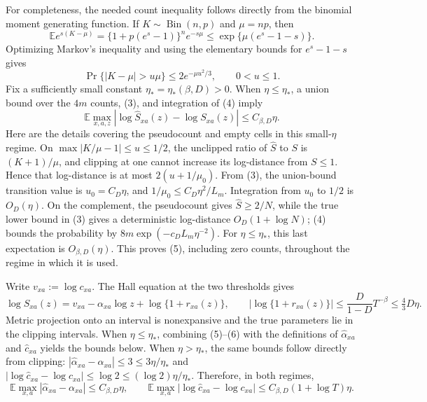 For completeness, the needed count inequality follows directly from the binomial moment generating function.  If \(K\sim\operatorname{Bin}(n,p)\) and \(\mu=np\), then
\[
\mathbb E e^{s(K-\mu)}
=\{1+p(e^s-1)\}^n e^{-s\mu}
\leq\exp\{\mu(e^s-1-s)\}.
\]
Optimizing Markov's inequality and using the elementary bounds for \(e^s-1-s\) gives
\[
\Pr\{|K-\mu|>u\mu\}\leq2e^{-\mu u^2/3},\qquad 0<u\leq1.               \tag{4}
\]
Fix a sufficiently small constant \(\eta_*=\eta_*(\beta,D)>0\).  When \(\eta\leq\eta_*\), a union bound over the \(4m\) counts, (3), and integration of (4) imply
\[
\mathbb E\max_{x,a,z}
\left|\log\widehat S_{xa}(z)-\log S_{xa}(z)\right|
\leq C_{\beta,D}\eta.                                                    \tag{5}
\]
Here are the details covering the pseudocount and empty cells in this small-\(\eta\) regime.  On
\(\max|K/\mu-1|\leq u\leq1/2\), the unclipped ratio of \(\widehat S\) to \(S\) is \((K+1)/\mu\), and clipping at one cannot increase its log-distance from \(S\leq1\).  Hence that log-distance is at most \(2(u+1/\mu_0)\).  From (3), the union-bound transition value is \(u_0=C_D\eta\), and \(1/\mu_0\leq C_D\eta^2/L_m\).  Integration from \(u_0\) to \(1/2\) is \(O_D(\eta)\).  On the complement, the pseudocount gives \(\widehat S\geq2/N\), while the true lower bound in (3) gives a deterministic log-distance \(O_D(1+\log N)\); (4) bounds the probability by \(8m\exp(-c_D L_m\eta^{-2})\).  For \(\eta\leq\eta_*\), this last expectation is \(O_{\beta,D}(\eta)\).  This proves (5), including zero counts, throughout the regime in which it is used.

Write \(v_{xa}:=\log c_{xa}\).  The Hall equation at the two thresholds gives
\[
\log S_{xa}(z)=v_{xa}-\alpha_{xa}\log z+\log\{1+r_{xa}(z)\},
\qquad
|\log\{1+r_{xa}(z)\}|\leq\frac{D}{1-D}T^{-\beta}\leq\tfrac43D\eta.     \tag{6}
\]
Metric projection onto an interval is nonexpansive and the true parameters lie in the clipping intervals.  When \(\eta\leq\eta_*\), combining (5)--(6) with the definitions of \(\widehat\alpha_{xa}\) and \(\widehat c_{xa}\) yields the bounds below.  When \(\eta>\eta_*\), the same bounds follow directly from clipping: \(|\widehat\alpha_{xa}-\alpha_{xa}|\leq3\leq3\eta/\eta_*\) and \(|\log\widehat c_{xa}-\log c_{xa}|\leq\log2\leq(\log2)\eta/\eta_*\).  Therefore, in both regimes,
\[
\mathbb E\max_{x,a}|\widehat\alpha_{xa}-\alpha_{xa}|
\leq C_{\beta,D}\eta,
\qquad
\mathbb E\max_{x,a}|\log\widehat c_{xa}-\log c_{xa}|
\leq C_{\beta,D}(1+\log T)\eta.                                         \tag{7}
\]

